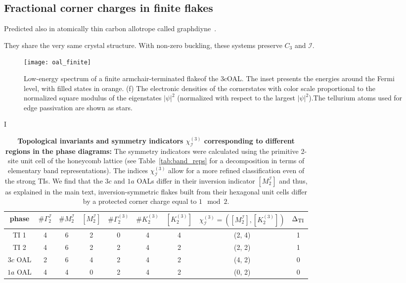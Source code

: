 {\subsection{Fractional corner charges in finite flakes}
Predicted also in atomically thin carbon allotrope called graphdiyne~\cite{GDY12019, GDY22019}.


They share the very same crystal structure. With non-zero buckling, these systems preserve $C_3$ and $\mathcal{I}$. 


\begin{figure}
\centering
\texttt{[image: oal\_finite]}
\caption{Low-energy spectrum of a finite armchair-terminated flakeof the 3cOAL. The inset presents the energies around the Fermi level, with filled states in orange. (f) The electronic densities of the cornerstates with color scale proportional to the normalized square modulus of the eigenstates $|\psi|^2$ (normalized with respect to the largest $|\psi|^2$).The tellurium atoms used for edge passivation are shown as stars.}
\label{fig:oal_finite}
\end{figure}


I\begin{table}[b]
	\centering
	\addtolength\tabcolsep{5pt}
	\begin{tabular}{|c||c|c|c|c|c|c||c||c|}
		\hline 
		phase & $\# \Gamma_2^{\mathcal{I}}$&  $\# M_2^{\mathcal{I}}$ & $[M^\mathcal{I}_2]$ & $\# \Gamma_2^{(3)}$ & $\# K_2^{(3)} $ & $[K^{(3)}_2]$  &  $\chi^{(3)}_{\mathcal{I}} = ([M^\mathcal{I}_2], [K^{(3)}_2])$ & $\Delta_{\textnormal{TI}}$ \\
\hline		
		TI 1 & 4 & 6 & 2 & 0 & 4 & 4  & (2, 4) & 1 \\
\hline 
		TI 2 & 4 & 6 & 2 & 2 & 4 & 2 & (2,  2) & 1 \\
		\hline 
		$3c$ OAL & 2 & 6 & 4 & 2 & 4 & 2  & (4, 2) & 0 \\
		\hline 
		$1a$ OAL & 4 & 4 & 0 & 2 & 4 & 2 & (0, 2) & 0\\
		\hline 
	\end{tabular} 
	\caption{\textbf{Topological invariants and symmetry indicators $\chi^{(3)}_{\mathcal{I}}$ corresponding to different regions in the phase diagrams:} The symmetry indicators were calculated using the primitive 2-site unit cell of the honeycomb lattice (see Table~\ref{tab:band_reps} for a decomposition in terms of elementary band representations). The indices $\chi^{(3)}_{\mathcal{I}}$ allow for a more refined classification even of the strong TIs. We find that the $3c$ and $1a$ OALs differ in their inversion indicator $[M^\mathcal{I}_2]$ and thus, as explained in the main text, inversion-symmetric flakes built from their hexagonal unit cells differ by a protected corner charge equal to $1 \mod 2$.}
	\label{tab:sym_indicators}	
\end{table}


}
